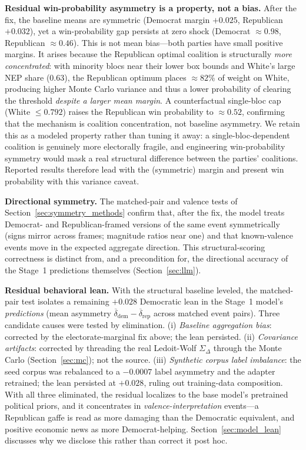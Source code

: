 \documentclass[12pt, letterpaper]{article}
\theoremstyle{definition}
\newcommand{\SigmaDelta}{\Sigma_{\Delta}}
\begin{document}
\textbf{Residual win-probability asymmetry is a property, not a bias.} After the fix,
the baseline means are symmetric (Democrat margin $+0.025$, Republican $+0.032$), yet a
win-probability gap persists at zero shock (Democrat $\approx 0.98$, Republican
$\approx 0.46$). This is not mean bias---both parties have small positive margins.
It arises because the Republican optimal coalition is structurally \emph{more
concentrated}: with minority blocs near their lower box bounds and White's large NEP
share ($0.63$), the Republican optimum places $\approx 82\%$ of weight on White,
producing higher Monte Carlo variance and thus a lower probability of clearing the
threshold \emph{despite a larger mean margin}. A counterfactual single-bloc cap
(White $\leq 0.792$) raises the Republican win probability to $\approx 0.52$, confirming
that the mechanism is coalition concentration, not baseline asymmetry. We retain this as
a modeled property rather than tuning it away: a single-bloc-dependent coalition is
genuinely more electorally fragile, and engineering win-probability symmetry would mask
a real structural difference between the parties' coalitions. Reported results therefore
lead with the (symmetric) margin and present win probability with this variance caveat.

\textbf{Directional symmetry.} The matched-pair and valence tests of
Section~\ref{sec:symmetry_methods} confirm that, after the fix, the model treats
Democrat- and Republican-framed versions of the same event symmetrically (signs mirror
across frames; magnitude ratios near one) and that known-valence events move in the
expected aggregate direction. This structural-scoring correctness is distinct from, and
a precondition for, the directional accuracy of the Stage~1 predictions themselves
(Section~\ref{sec:llm}).

\textbf{Residual behavioral lean.} With the structural baseline leveled, the
matched-pair test isolates a remaining $+0.028$ Democratic lean in the Stage~1
model's \emph{predictions} (mean asymmetry
$\overline{\delta}_{\text{dem}} - \overline{\delta}_{\text{rep}}$ across matched
event pairs). Three candidate causes were tested by elimination. (i)
\emph{Baseline aggregation bias}: corrected by the electorate-marginal fix above;
the lean persisted. (ii) \emph{Covariance artifacts}: corrected by threading the
real Ledoit-Wolf $\SigmaDelta$ through the Monte Carlo (Section~\ref{sec:mc});
not the source. (iii) \emph{Synthetic corpus label imbalance}: the seed corpus was
rebalanced to a $-0.0007$ label asymmetry and the adapter retrained; the lean
persisted at $+0.028$, ruling out training-data composition. With all three
eliminated, the residual localizes to the base model's pretrained political
priors, and it concentrates in \emph{valence-interpretation} events---a
Republican gaffe is read as more damaging than the Democratic equivalent, and
positive economic news as more Democrat-helping. Section~\ref{sec:model_lean}
discusses why we disclose this rather than correct it post hoc.
\end{document}
